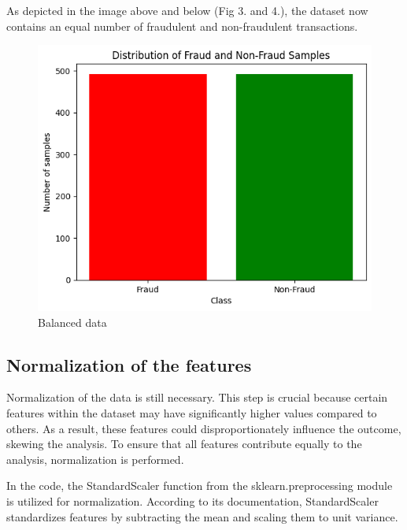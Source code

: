 \documentclass[conference]{IEEEtran}
\begin{document}
As depicted in the image above and below (Fig 3. and 4.), the dataset now contains an equal number of fraudulent and non-fraudulent transactions.

\begin{figure}[H]
    \centering
    \includegraphics[width=1\linewidth]{images/subsamplingraph.png}
    \caption{Balanced data}
    \label{fig:enter-label2}
\end{figure}

\subsection{Normalization of the features}

Normalization of the data is still necessary. This step is crucial because certain features within the dataset may have significantly higher values compared to others. As a result, these features could disproportionately influence the outcome, skewing the analysis. To ensure that all features contribute equally to the analysis, normalization is performed.

In the code, the StandardScaler function from the sklearn.preprocessing module is utilized for normalization. According to its documentation, StandardScaler standardizes features by subtracting the mean and scaling them to unit variance.
\end{document}
